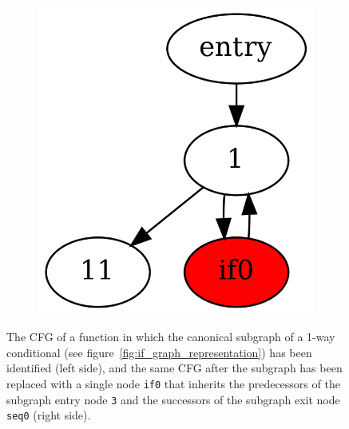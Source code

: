 \begin{figure}[htbp]
\begin{subfigure}[ht]{0.17\textwidth}
	\end{subfigure}
	\qquad
	\begin{subfigure}[ht]{0.17\textwidth}
		\includegraphics[width=\textwidth]{inc/3_background/hammock_method/cfg_post_merge.png}
	\end{subfigure}
	\caption{The CFG of a function in which the canonical subgraph of a 1-way conditional (see figure~\ref{fig:if_graph_representation}) has been identified (left side), and the same CFG after the subgraph has been replaced with a single node \texttt{if0} that inherits the predecessors of the subgraph entry node \texttt{3} and the successors of the subgraph exit node \texttt{seq0} (right side).}
	\label{fig:subgraph_merge}
\end{figure}



